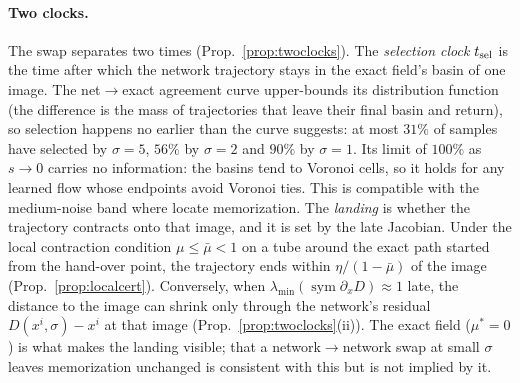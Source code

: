 \paragraph{Two clocks.}
The swap separates two times (Prop.~\ref{prop:twoclocks}). %
The \emph{selection clock} $t_{\rm sel}$ is the time after which the network trajectory stays in the
exact field's basin of one image. The net$\to$exact agreement curve upper-bounds its distribution
function (the difference is the mass of trajectories that leave their final basin and return), so
selection happens no earlier than the curve suggests: at most $31\%$ of samples have selected by
$\sigma=5$, $56\%$ by $\sigma=2$ and $90\%$ by $\sigma=1$. Its limit of $100\%$ as $s\to0$ carries
no information: the basins tend to Voronoi cells, so it holds for any learned flow whose endpoints
avoid Voronoi ties. This is compatible with the medium-noise band
where \citet{dodson2026} %
locate memorization. The \emph{landing} is whether the trajectory contracts onto that image, and
it is set by the late Jacobian. Under the local contraction condition $\mu\le\bar\mu<1$ on a tube
around the exact path started from the hand-over point, the trajectory ends within
$\eta/(1-\bar\mu)$ of the image (Prop.~\ref{prop:localcert}). %
Conversely, when $\lambda_{\min}(\operatorname{sym}\partial_x D)\approx1$ late, the distance to the
image can shrink only through the network's residual $D(x^i,\sigma)-x^i$ at that image
(Prop.~\ref{prop:twoclocks}(ii)). %
The exact field ($\mu^*=0$) is what makes the landing visible; that a network$\to$network swap at
small $\sigma$ leaves memorization unchanged \citep{dodson2026} is consistent with this but is not
implied by it.

